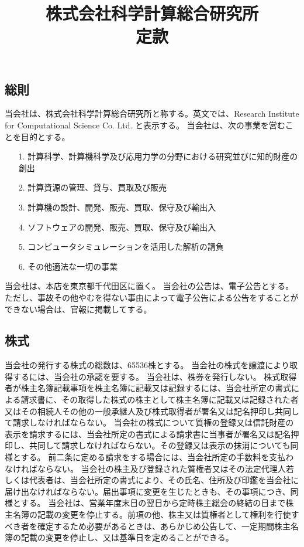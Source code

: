 \documentclass[11pt,a4paper]{jsarticle}
\begin{document}
\title{株式会社科学計算総合研究所\\定款}
\date{}
\maketitle


\subsection{総則}
当会社は、株式会社科学計算総合研究所と称する。英文では、Research Institute for Computational Science Co. Ltd. と表示する。
当会社は、次の事業を営むことを目的とする。
\begin{enumerate}
  \item[1.] 計算科学、計算機科学及び応用力学の分野における研究並びに知的財産の創出
  \item[2.] 計算資源の管理、貸与、買取及び販売
  \item[3.] 計算機の設計、開発、販売、買取、保守及び輸出入
  \item[4.] ソフトウェアの開発、販売、買取、保守及び輸出入
  \item[5.] コンピュータシミュレーションを活用した解析の請負
  \item[6.] その他適法な一切の事業
\end{enumerate}
当会社は、本店を東京都千代田区に置く。
当会社の公告は、電子公告とする。ただし、事故その他やむを得ない事由によって電子公告による公告をすることができない場合は、官報に掲載してする。


\subsection{株式}
当会社の発行する株式の総数は、65536株とする。
当会社の株式を譲渡により取得するには、当会社の承認を要する。
当会社は、株券を発行しない。
株式取得者が株主名簿記載事項を株主名簿に記載又は記録するには、当会社所定の書式による請求書に、その取得した株式の株主として株主名簿に記載又は記録された者又はその相続人その他の一般承継人及び株式取得者が署名又は記名押印し共同して請求しなければならない。
当会社の株式について質権の登録又は信託財産の表示を請求するには、当会社所定の書式による請求書に当事者が署名又は記名押印し、共同して請求しなければならない。その登録又は表示の抹消についても同様とする。
前二条に定める請求をする場合には、当会社所定の手数料を支払わなければならない。
当会社の株主及び登録された質権者又はその法定代理人若しくは代表者は、当会社所定の書式により、その氏名、住所及び印鑑を当会社に届け出なければならない。届出事項に変更を生じたときも、その事項につき、同様とする。
当会社は、営業年度末日の翌日から定時株主総会の終結の日まで株主名簿の記載の変更を停止する。前項の他、株主又は質権者として権利を行使すべき者を確定するため必要があるときは、あらかじめ公告して、一定期間株主名簿の記載の変更を停止し、又は基準日を定めることができる。
\end{document}
